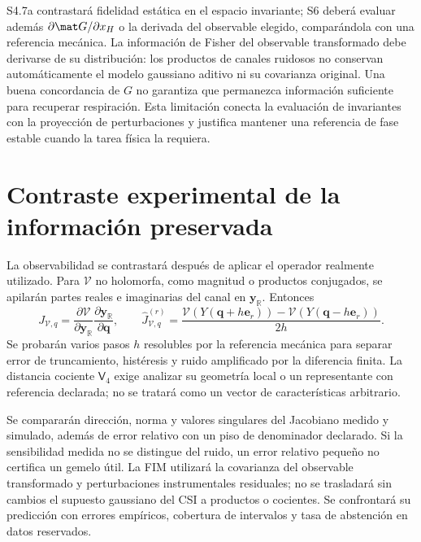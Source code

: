 S4.7a contrastará fidelidad estática en el espacio invariante; S6 deberá evaluar
además $\partial\mat G/\partial x_H$ o la derivada del observable elegido,
comparándola con una referencia mecánica. La información de Fisher del observable
transformado debe derivarse de su distribución: los productos de canales
ruidosos no conservan automáticamente el modelo gaussiano aditivo ni su
covarianza original. Una buena concordancia de $G$ no garantiza que permanezca
información suficiente para recuperar respiración. Esta limitación conecta
la evaluación de invariantes con la proyección de perturbaciones y justifica
mantener una referencia de fase estable cuando la tarea física la requiera.

\section{Contraste experimental de la información preservada}
\label{sec:observable_jacobian_test}

La observabilidad se contrastará después de aplicar el operador realmente utilizado.
Para $\mathcal V$ no holomorfa, como magnitud o productos conjugados, se apilarán
partes reales e imaginarias del canal en $\mathbf y_{\mathbb R}$. Entonces
\begin{equation}
J_{\mathcal V,q}=\frac{\partial\mathcal V}{\partial\mathbf y_{\mathbb R}}
\frac{\partial\mathbf y_{\mathbb R}}{\partial\mathbf q},\qquad
\widehat J_{\mathcal V,q}^{(r)}=
\frac{\mathcal V(Y(\mathbf q+h\mathbf e_r))-
\mathcal V(Y(\mathbf q-h\mathbf e_r))}{2h}.
\label{eq:observable_real_jacobian}
\end{equation}
Se probarán varios pasos $h$ resolubles por la referencia mecánica para separar
error de truncamiento, histéresis y ruido amplificado por la diferencia finita.
La distancia cociente $\mathsf V_4$ exige analizar su geometría local o un representante
con referencia declarada; no se tratará como un vector de características arbitrario.

Se compararán dirección, norma y valores singulares del Jacobiano medido y simulado,
además de error relativo con un piso de denominador declarado. Si la sensibilidad
medida no se distingue del ruido, un error relativo pequeño no certifica un gemelo
útil. La FIM utilizará la covarianza del observable transformado y perturbaciones
instrumentales residuales; no se trasladará sin cambios el supuesto gaussiano del
CSI a productos o cocientes. Se confrontará su predicción con errores empíricos,
cobertura de intervalos y tasa de abstención en datos reservados.

